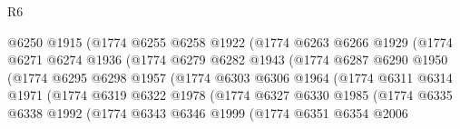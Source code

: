 \begin{lexlean}{R6}
\begin{coremodule}
                              @6250
                              @1915
                              (@1774
                                @6255
                                @6258
                                @1922
                                (@1774
                                  @6263
                                  @6266
                                  @1929
                                  (@1774
                                    @6271
                                    @6274
                                    @1936
                                    (@1774
                                      @6279
                                      @6282
                                      @1943
                                      (@1774
                                        @6287
                                        @6290
                                        @1950
                                        (@1774
                                          @6295
                                          @6298
                                          @1957
                                          (@1774
                                            @6303
                                            @6306
                                            @1964
                                            (@1774
                                              @6311
                                              @6314
                                              @1971
                                              (@1774
                                                @6319
                                                @6322
                                                @1978
                                                (@1774
                                                  @6327
                                                  @6330
                                                  @1985
                                                  (@1774
                                                    @6335
                                                    @6338
                                                    @1992
                                                    (@1774
                                                      @6343
                                                      @6346
                                                      @1999
                                                      (@1774
                                                        @6351
                                                        @6354
                                                        @2006

\end{coremodule}
\end{lexlean}
